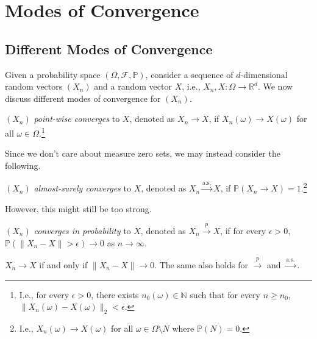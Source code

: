 \chapter{Modes of Convergence}
\section{Different Modes of Convergence}
Given a probability space \((\Omega , \mathscr{F} , \mathbb{P} )\), consider a sequence of \(d\)-dimensional random vectors \((X_n)\) and a random vector \(X\), i.e., \(X_n , X\colon \Omega \to \mathbb{R} ^d\). We now discuss different modes of convergence for \((X_n)\).

\begin{definition}\label{def:point-wise-converge}
	\((X_n)\) \emph{point-wise converges} to \(X\), denoted as \(X_n \to X\), if \(X_n(\omega ) \to X(\omega )\) for all \(\omega \in \Omega \).\footnote{I.e., for every \(\epsilon > 0\), there exists \(n_0(\omega ) \in \mathbb{N} \) such that for every \(n \geq n_0\), \(\lVert X_n(\omega ) - X(\omega ) \rVert _2 < \epsilon \).}
\end{definition}

Since we don't care about measure zero sets, we may instead consider the following.

\begin{definition}\label{def:almost-surely-converge}
	\((X_n)\) \emph{almost-surely converges} to \(X\), denoted as \(X_n \overset{\text{a.s.}}{\to } X\), if \(\mathbb{P} (X_n \to X) = 1\).\footnote{I.e., \(X_n(\omega ) \to X(\omega )\) for all \(\omega \in \Omega \setminus N\) where \(\mathbb{P} (N) = 0\).}
\end{definition}

However, this might still be too strong.

\begin{definition}\label{def:converge-in-probability}
	\((X_n)\) \emph{converges in probability} to \(X\), denoted as \(X_n \overset{p}{\to } X\), if for every \(\epsilon > 0\), \(\mathbb{P} (\lVert X_n - X \rVert > \epsilon ) \to 0\) as \(n \to \infty \).
\end{definition}

\begin{remark}
	\(X_n \to X\) if and only if \(\lVert X_n - X \rVert \to 0\). The same also holds for \(\overset{p}{\to } \) and \(\overset{\text{a.s.} }{\to } \).
\end{remark}

